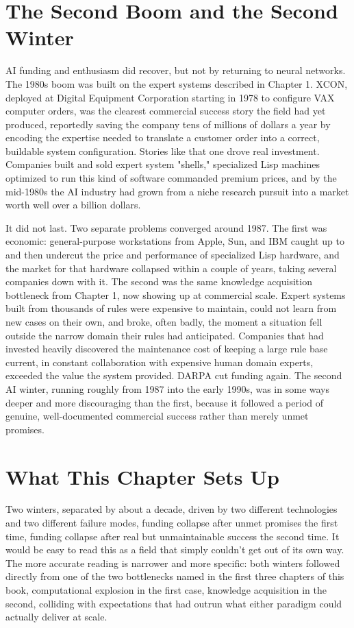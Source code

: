\section*{The Second Boom and the Second Winter}

AI funding and enthusiasm did recover, but not by returning to neural networks. The 1980s boom was built on the expert systems described in Chapter 1. XCON, deployed at Digital Equipment Corporation starting in 1978 to configure VAX computer orders, was the clearest commercial success story the field had yet produced, reportedly saving the company tens of millions of dollars a year by encoding the expertise needed to translate a customer order into a correct, buildable system configuration. Stories like that one drove real investment. Companies built and sold expert system "shells," specialized Lisp machines optimized to run this kind of software commanded premium prices, and by the mid-1980s the AI industry had grown from a niche research pursuit into a market worth well over a billion dollars.

It did not last. Two separate problems converged around 1987. The first was economic: general-purpose workstations from Apple, Sun, and IBM caught up to and then undercut the price and performance of specialized Lisp hardware, and the market for that hardware collapsed within a couple of years, taking several companies down with it. The second was the same knowledge acquisition bottleneck from Chapter 1, now showing up at commercial scale. Expert systems built from thousands of rules were expensive to maintain, could not learn from new cases on their own, and broke, often badly, the moment a situation fell outside the narrow domain their rules had anticipated. Companies that had invested heavily discovered the maintenance cost of keeping a large rule base current, in constant collaboration with expensive human domain experts, exceeded the value the system provided. DARPA cut funding again. The second AI winter, running roughly from 1987 into the early 1990s, was in some ways deeper and more discouraging than the first, because it followed a period of genuine, well-documented commercial success rather than merely unmet promises.

\section*{What This Chapter Sets Up}

Two winters, separated by about a decade, driven by two different technologies and two different failure modes, funding collapse after unmet promises the first time, funding collapse after real but unmaintainable success the second time. It would be easy to read this as a field that simply couldn't get out of its own way. The more accurate reading is narrower and more specific: both winters followed directly from one of the two bottlenecks named in the first three chapters of this book, computational explosion in the first case, knowledge acquisition in the second, colliding with expectations that had outrun what either paradigm could actually deliver at scale.

